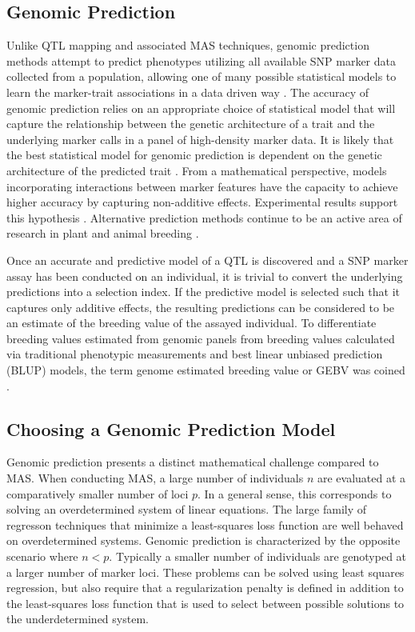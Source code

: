 \subsection{Genomic Prediction}

Unlike QTL mapping and associated MAS techniques, genomic prediction methods 
attempt to predict phenotypes utilizing all available SNP marker data collected 
from a population, allowing one of many possible statistical models to learn 
the marker-trait associations in a data driven way \citep{meuwissen2001}. 
The accuracy of genomic prediction relies on an appropriate choice of statistical model that 
will capture the relationship between the genetic architecture
of a trait and the underlying marker calls in a panel of high-density marker 
data. It is likely that the best statistical model for genomic prediction is 
dependent on the genetic architecture of 
the predicted trait \citep{crossa2010, gonzalez-camacho2012, 
resende2012, cleveland2012, thavamanikumar2015}.  From a mathematical perspective,
models incorporating interactions between marker features have the 
capacity to achieve higher accuracy by capturing non-additive effects. 
Experimental results support this hypothesis \citep{gonzalez-camacho2012}. 
Alternative prediction methods continue to be an active area of research 
in plant and animal breeding \citep{koning2012}.

Once an accurate and predictive model of a QTL is discovered and a SNP marker
assay has been conducted on an individual, it is trivial to convert the underlying
predictions into a selection index. If the predictive model is selected 
such that it captures only additive effects, the resulting predictions can be 
considered to be an estimate of the breeding value of the assayed individual.
To differentiate breeding values estimated from genomic panels from breeding values
calculated via traditional phenotypic measurements and best linear unbiased prediction (BLUP)
models, the term genome estimated breeding value or GEBV was coined \citep{meuwissen2001}.

\subsection{Choosing a Genomic Prediction Model}

Genomic prediction presents a distinct mathematical challenge compared to MAS.
When conducting MAS, a large number of individuals $n$ are evaluated at a
comparatively smaller number of loci $p$. In a general sense, this corresponds 
to solving an overdetermined system of linear equations. The large family of 
regresson techniques that minimize a least-squares loss function are well
behaved on overdetermined systems. Genomic prediction is characterized by the opposite
scenario where $n < p$. Typically a smaller number of individuals are genotyped
at a larger number of marker loci. These problems can be solved using least squares regression,
but also require that a regularization penalty is defined in addition to the least-squares 
loss function that is used to select between possible solutions to the underdetermined
system. 

